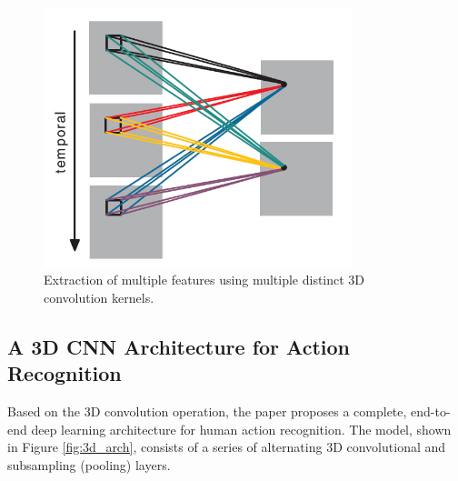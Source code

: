 \begin{figure}[H]
    \centering
    \includegraphics[width=0.8\textwidth]{archivos/figuras/extraction.jpg} 
    \caption{Extraction of multiple features using multiple distinct 3D convolution kernels.}
    \label{fig:multiple_features}
\end{figure}

\subsection{A 3D CNN Architecture for Action Recognition}

Based on the 3D convolution operation, the paper proposes a complete, end-to-end deep learning architecture for human action recognition. The model, shown in Figure \ref{fig:3d_arch}, consists of a series of alternating 3D convolutional and subsampling (pooling) layers.

